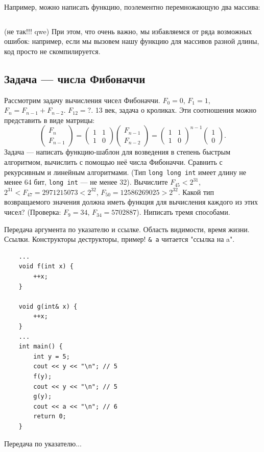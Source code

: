 \documentclass{book}
\begin{document}
Например, можно написать функцию, поэлементно перемножающую два массива:
\inputminted{cpp}{mult-arrays.cpp}
(не так!!! qwe) При этом, что очень важно, мы избавляемся от ряда возможных ошибок: например, если мы вызовем нашу
функцию для массивов разной длины, код просто не скомпилируется.

\subsection{Задача --- числа Фибоначчи}
Рассмотрим задачу вычисления чисел Фибоначчи. $F_0 = 0$, $F_1 = 1$, $F_n = F_{n-1} + F_{n-2}$.
$F_{12} = ?$.
13 век, задача о кроликах. Эти
соотношения можно представить в виде матрицы:
\begin{equation}
    \begin{pmatrix} F_n \\ F_{n-1} \end{pmatrix} = \begin{pmatrix} 1 & 1 \\ 1 & 0 \end{pmatrix}
    \begin{pmatrix} F_{n - 1} \\ F_{n - 2} \end{pmatrix} = \begin{pmatrix} 1 & 1 \\ 1 & 0
\end{pmatrix}^{n - 1} \begin{pmatrix} 1 \\ 0 \end{pmatrix}.
\end{equation}
Задача --- написать функцию-шаблон для возведения в степень быстрым алгоритмом, вычислить с помощью
неё числа Фибоначчи. Сравнить с рекурсивным и линейным алгоритмами. (Тип
\texttt{long long int} имеет длину не менее 64 бит, \texttt{long int} --- не
менее 32). Вычислите $F_{45} < 2^{31}$, $2^{31} < F_{47} = 2971215073 < 2^{32}$, $F_{50} =
12586269025 > 2^{32}$.  Какой тип возвращаемого значения должна иметь функция для вычисления
каждого из этих чисел?  (Проверка: $F_{9} = 34$, $F_{34} = 5702887$). Ниписать тремя способами.


Передача аргумента по указателю и ссылке. Область видимости, время жизни.
Ссылки. Конструкторы деструкторы, пример! \texttt{& a} читается "ссылка на a".
\begin{verbatim}
    ...
    void f(int x) {
        ++x; 
    }

    void g(int& x) {
        ++x; 
    }
    ... 
    int main() {
        int y = 5; 
        cout << y << "\n"; // 5 
        f(y); 
        cout << y << "\n"; // 5 
        g(y); 
        cout << a << "\n"; // 6
        return 0;
    }
\end{verbatim}
Передача по указателю...
\end{document}
